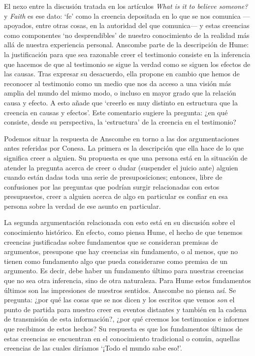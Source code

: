 El nexo entre la discusión tratada en los artículos \emph{What is it to believe someone?} y \emph{Faith} es ese dato: `fe' como la creencia depositada en lo que se nos comunica ---apoyados, entre otras cosas, en la autoridad del que comunica--- y estas creencias como componentes `no desprendibles' de nuestro conocimiento de la realidad más allá de nuestra experiencia personal. Anscombe parte de la descripción de Hume: la justificación para que sea razonable creer el testimonio consiste en la inferencia que hacemos de que al testimonio se sigue la verdad como se siguen los efectos de las causas. Tras expresar su desacuerdo, ella propone en cambio que hemos de reconocer al testimonio como un medio que nos da acceso a una visión más amplia del mundo del mismo modo, o incluso en mayor grado que la relación causa y efecto. A esto añade que \enquote*{creerlo es muy distinto en estructura que la creencia en causas y efectos}. Este comentario sugiere la pregunta: ¿en qué consiste, desde su perspectiva, la `estructura' de la creencia en el testimonio?

Podemos situar la respuesta de Anscombe en torno a las dos argumentaciones antes referidas por Conesa. La primera es la descripción que ella hace de lo que significa creer a alguien. Su propuesta es que una persona está en la situación de atender la pregunta acerca de creer o dudar (suspender el juicio ante) alguien cuando están dadas toda una serie de presuposiciones; entonces, libre de confusiones por las preguntas que podrían surgir relacionadas con estos presupuestos, creer a alguien acerca de algo en particular es confiar en esa persona sobre la verdad de ese asunto en particular.

La segunda argumentación relacionada con esto está en su discusión sobre el conocimiento histórico. En efecto, como piensa Hume, el hecho de que tenemos creencias justificadas sobre fundamentos que se consideran premisas de argumentos, presupone que hay creencias sin fundamento, o al menos, que no tienen como fundamento algo que pueda considerarse como premisa de un argumento. Es decir, debe haber un fundamento último para nuestras creencias que no sea otra inferencia, sino de otra naturaleza. Para Hume estos fundamentos últimos son las impresiones de nuestros sentidos. Anscombe no piensa así. Se pregunta: ¿por qué las cosas que se nos dicen y los escritos que vemos \emph{son} el punto de partida para nuestro creer en eventos distantes y también en la cadena de transmisión de esta información?, ¿por qué creemos los testimonios e informes que recibimos de estos hechos? Su respuesta es que los fundamentos últimos de estas creencias se encuentran en el conocimiento tradicional o común, aquellas creencias de las cuales diríamos \enquote*{¡Todo el mundo sabe eso!}.

